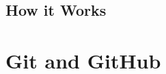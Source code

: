 \documentclass[10pt,t,xcolor=table]{UWMadBeamer}
\begin{document}
    \subsection{How it Works}
    

\section{Git and GitHub}
\end{document}
